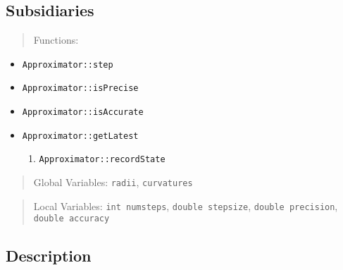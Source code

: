 \documentclass[10pt]{article}%
\begin{document}
\subsection*{Subsidiaries}

\begin{quotation} Functions: \end{quotation}
\begin{itemize}
\item  \texttt{Approximator::step}
\item  \texttt{Approximator::isPrecise}
\item  \texttt{Approximator::isAccurate} 
\item  \texttt{Approximator::getLatest}
\begin{enumerate}
\item  \texttt{Approximator::recordState}
\end{enumerate}
\end{itemize}
\begin{quotation} Global Variables: \texttt{radii}, \texttt{curvatures}\end{quotation}
\begin{quotation} Local Variables: \texttt{int numsteps}, \texttt{double stepsize}, \texttt{double precision}, \texttt{double accuracy}\end{quotation}

\subsection*{Description}
\end{document}
